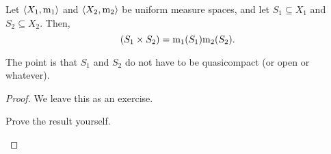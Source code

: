 \begin{prp}
Let $\langle X_1,\mathrm{m} _1\rangle$ and $\langle X_2,\mathrm{m} _2\rangle$ be uniform measure spaces, and let $S_1\subseteq X_1$ and $S_2\subseteq X_2$.  Then,
\begin{equation}
[\meas _1\times \meas _2](S_1\times S_2)=\meas _1(S_1)\meas _2(S_2).
\end{equation}
\begin{rmk}
The point is that $S_1$ and $S_2$ do not have to be quasicompact (or open or whatever).
\end{rmk}
\begin{proof}
We leave this as an exercise.
\begin{exr}
Prove the result yourself.
\end{exr}
\end{proof}
\end{prp}

